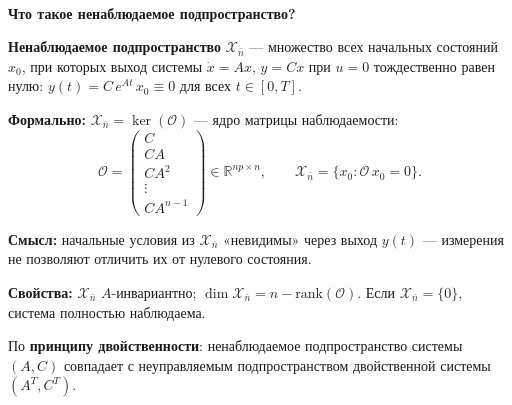 \documentclass[12pt,a4paper]{article}
\begin{document}
	\begin{qblock}
		\\
		{\bfseries Что такое ненаблюдаемое подпространство?}
		
		\medskip
		\textbf{Ненаблюдаемое подпространство} $\mathcal{X}_{\bar{n}}$ --- множество всех начальных
		состояний $x_0$, при которых выход системы $\dot{x}=Ax$, $y=Cx$ при $u=0$
		тождественно равен нулю: $y(t) = C\,e^{At}\,x_0 \equiv 0$ для всех $t \in [0,T]$.
		
		\medskip
		\textbf{Формально:} $\mathcal{X}_{\bar{n}} = \ker(\mathcal{O})$ --- ядро матрицы наблюдаемости:
		\[
		\mathcal{O} = \begin{pmatrix} C \\ CA \\ CA^2 \\ \vdots \\ CA^{n-1} \end{pmatrix} \in \mathbb{R}^{np \times n},
		\qquad
		\mathcal{X}_{\bar{n}} = \{x_0 : \mathcal{O}\,x_0 = 0\}.
		\]
		
		\textbf{Смысл:} начальные условия из $\mathcal{X}_{\bar{n}}$ «невидимы» через выход $y(t)$ ---
		измерения не позволяют отличить их от нулевого состояния.
		
		\textbf{Свойства:} $\mathcal{X}_{\bar{n}}$ $A$-инвариантно;
		$\dim \mathcal{X}_{\bar{n}} = n - \mathrm{rank}(\mathcal{O})$.
		Если $\mathcal{X}_{\bar{n}} = \{0\}$, система полностью наблюдаема.
		
		По \textbf{принципу двойственности}: ненаблюдаемое подпространство системы $(A,C)$
		совпадает с неуправляемым подпространством двойственной системы $(A^T,C^T)$.
	\end{qblock}
	
\end{document}
